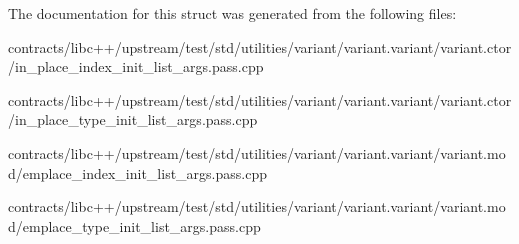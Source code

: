 The documentation for this struct was generated from the following files\+:\begin{DoxyCompactItemize}
\item 
contracts/libc++/upstream/test/std/utilities/variant/variant.\+variant/variant.\+ctor/in\+\_\+place\+\_\+index\+\_\+init\+\_\+list\+\_\+args.\+pass.\+cpp\item 
contracts/libc++/upstream/test/std/utilities/variant/variant.\+variant/variant.\+ctor/in\+\_\+place\+\_\+type\+\_\+init\+\_\+list\+\_\+args.\+pass.\+cpp\item 
contracts/libc++/upstream/test/std/utilities/variant/variant.\+variant/variant.\+mod/emplace\+\_\+index\+\_\+init\+\_\+list\+\_\+args.\+pass.\+cpp\item 
contracts/libc++/upstream/test/std/utilities/variant/variant.\+variant/variant.\+mod/emplace\+\_\+type\+\_\+init\+\_\+list\+\_\+args.\+pass.\+cpp\end{DoxyCompactItemize}
